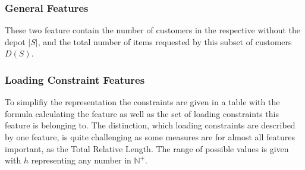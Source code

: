 \subsubsection{General Features}
These two feature contain the number of customers in the respective without the depot $|S|$, and the total number of items requested by
this subset of customers $D(S)$.

\subsubsection{Loading Constraint Features}

To simplifiy the representation the constraints are given in a table with the formula calculating the feature as well as the set of
loading constraints this feature is belonging to. The distinction, which loading constraints are described by one feature, is quite
challenging as some measures are for almost all features important, as the Total Relative Length. The range of possible values is
given with $h$ representing any number in $\mathbb{N}^{+}$.

